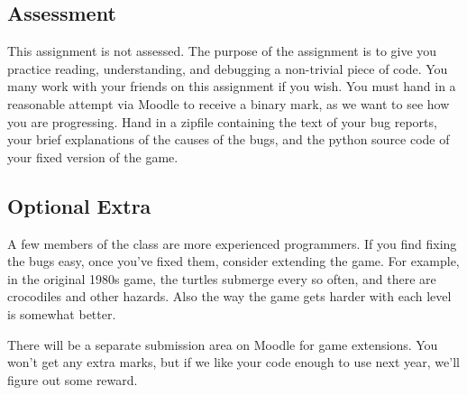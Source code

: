 \documentclass{article}
\begin{document}
\subsection*{Assessment}

This assignment is not assessed.  The purpose of the assignment is to
give you practice reading, understanding, and debugging a non-trivial
piece of code.  You many work with your friends on this assignment if
you wish.  You must hand in a reasonable attempt via Moodle to receive
a binary mark, as we want to see how you are progressing.  Hand in a
zipfile containing the text of your bug reports, your brief
explanations of the causes of the bugs, and the python source code of
your fixed version of the game.

\subsection*{Optional Extra}

A few members of the class are more experienced programmers.  If you
find fixing the bugs easy, once you've fixed them, consider extending
the game.  For example, in the original 1980s game, the turtles submerge
every so often, and there are crocodiles and other hazards.  Also the
way the game gets harder with each level is somewhat better.

There will be a separate submission area on Moodle for game
extensions.  You won't get any extra marks, but if we like your code
enough to use next year, we'll figure out some reward.
\end{document}
